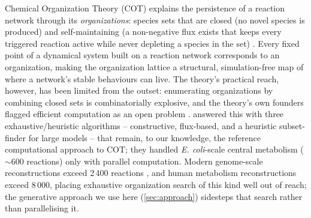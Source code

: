 \documentclass[nocrop]{bioinfo}
\begin{document}
Chemical Organization Theory (COT) explains the persistence of a reaction network through its
\emph{organizations}: species sets that are closed (no novel species is produced) and
self-maintaining (a non-negative flux exists that keeps every triggered reaction active while
never depleting a species in the set) \citep{seminal}. Every fixed point of a dynamical system
built on a reaction network corresponds to an organization, making the organization lattice a
structural, simulation-free map of where a network's stable behaviours can live. The theory's
practical reach, however, has been limited from the outset: enumerating organizations by
combining closed sets is combinatorially explosive, and the theory's own founders flagged
efficient computation as an open problem \citep{seminal,centler2008computing}. \citet{centler2008computing}
answered this with three exhaustive/heuristic algorithms -- constructive, flux-based, and a
heuristic subset-finder for large models -- that remain, to our knowledge, the reference
computational approach to COT; they handled \textit{E. coli}-scale central metabolism
($\sim$600 reactions) only with parallel computation. Modern genome-scale reconstructions
exceed 2\,400 reactions \citep{orth2011comprehensive}, and human metabolism reconstructions
exceed 8\,000, placing exhaustive organization search of this kind well out of reach; the
generative approach we use here (\cref{sec:approach}) sidesteps that search rather than
parallelising it.
\end{document}
